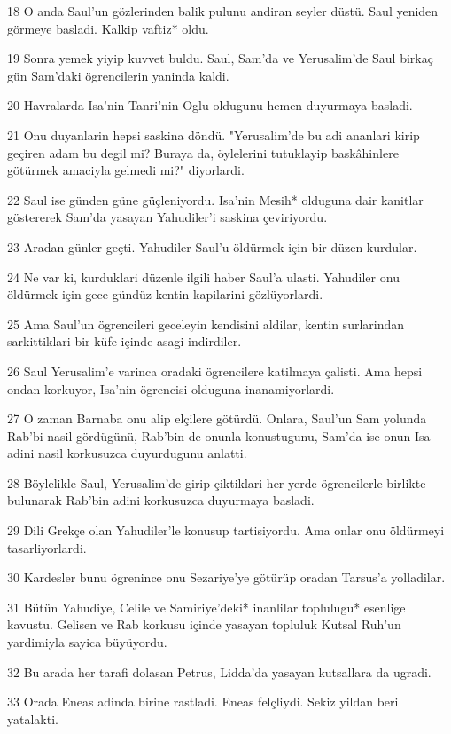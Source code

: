 \par 18 O anda Saul'un gözlerinden balik pulunu andiran seyler düstü. Saul yeniden görmeye basladi. Kalkip vaftiz* oldu.
\par 19 Sonra yemek yiyip kuvvet buldu. Saul, Sam'da ve Yerusalim'de Saul birkaç gün Sam'daki ögrencilerin yaninda kaldi.
\par 20 Havralarda Isa'nin Tanri'nin Oglu oldugunu hemen duyurmaya basladi.
\par 21 Onu duyanlarin hepsi saskina döndü. "Yerusalim'de bu adi ananlari kirip geçiren adam bu degil mi? Buraya da, öylelerini tutuklayip baskâhinlere götürmek amaciyla gelmedi mi?" diyorlardi.
\par 22 Saul ise günden güne güçleniyordu. Isa'nin Mesih* olduguna dair kanitlar göstererek Sam'da yasayan Yahudiler'i saskina çeviriyordu.
\par 23 Aradan günler geçti. Yahudiler Saul'u öldürmek için bir düzen kurdular.
\par 24 Ne var ki, kurduklari düzenle ilgili haber Saul'a ulasti. Yahudiler onu öldürmek için gece gündüz kentin kapilarini gözlüyorlardi.
\par 25 Ama Saul'un ögrencileri geceleyin kendisini aldilar, kentin surlarindan sarkittiklari bir küfe içinde asagi indirdiler.
\par 26 Saul Yerusalim'e varinca oradaki ögrencilere katilmaya çalisti. Ama hepsi ondan korkuyor, Isa'nin ögrencisi olduguna inanamiyorlardi.
\par 27 O zaman Barnaba onu alip elçilere götürdü. Onlara, Saul'un Sam yolunda Rab'bi nasil gördügünü, Rab'bin de onunla konustugunu, Sam'da ise onun Isa adini nasil korkusuzca duyurdugunu anlatti.
\par 28 Böylelikle Saul, Yerusalim'de girip çiktiklari her yerde ögrencilerle birlikte bulunarak Rab'bin adini korkusuzca duyurmaya basladi.
\par 29 Dili Grekçe olan Yahudiler'le konusup tartisiyordu. Ama onlar onu öldürmeyi tasarliyorlardi.
\par 30 Kardesler bunu ögrenince onu Sezariye'ye götürüp oradan Tarsus'a yolladilar.
\par 31 Bütün Yahudiye, Celile ve Samiriye'deki* inanlilar toplulugu* esenlige kavustu. Gelisen ve Rab korkusu içinde yasayan topluluk Kutsal Ruh'un yardimiyla sayica büyüyordu.
\par 32 Bu arada her tarafi dolasan Petrus, Lidda'da yasayan kutsallara da ugradi.
\par 33 Orada Eneas adinda birine rastladi. Eneas felçliydi. Sekiz yildan beri yatalakti.
